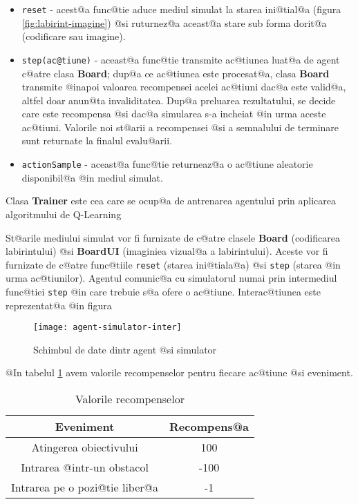 \begin{itemize}
	\item \texttt{reset} - acest@a func@tie aduce mediul simulat la starea ini@tial@a (figura \ref{fig:labirint-imagine}) @si ruturnez@a aceast@a stare sub forma dorit@a (codificare sau imagine).
	\item \texttt{step(ac@tiune)} - aceast@a func@tie transmite ac@tiunea luat@a de agent c@atre clasa \textbf{Board}; dup@a ce ac@tiunea este procesat@a, clasa \textbf{Board} transmite @inapoi valoarea recompensei acelei ac@tiuni dac@a este valid@a, altfel doar anun@ta invaliditatea. Dup@a preluarea rezultatului, se decide care este recompensa @si dac@a simularea s-a incheiat @in urma aceste ac@tiuni. Valorile noi st@arii a recompensei @si a semnalului de terminare sunt returnate la finalul evalu@arii.
	\item \texttt{actionSample} - aceast@a func@tie returneaz@a o ac@tiune aleatorie disponibil@a @in mediul simulat.
\end{itemize}

Clasa \textbf{Trainer} este cea care se ocup@a de antrenarea agentului prin aplicarea algoritmului de Q-Learning


St@arile mediului simulat vor fi furnizate de c@atre clasele \textbf{Board} (codificarea labirintului) @si \textbf{BoardUI} (imaginiea vizual@a a labirintului). Aceste vor fi furnizate de c@atre func@tiile \texttt{reset} (starea ini@tiala@a) @si \texttt{step} (starea @in urma ac@tiunilor). Agentul comunic@a cu simulatorul numai prin intermediul func@tiei \texttt{step} @in care trebuie s@a ofere o ac@tiune. Interac@tiunea este reprezentat@a @in figura 

\begin{figure}[h!]
	\centering
	\texttt{[image: agent-simulator-inter]}
	\caption{Schimbul de date dintr agent @si simulator}
	\label{fig:agent-simulator-inter}
\end{figure}

@In tabelul \ref{fig:tabel-recompense} avem valorile recompenselor pentru fiecare ac@tiune @si eveniment.

\begin{table}[H]
	\begin{center}
		\begin{tabular}{|c|c|} 
			\hline
			Eveniment & Recompens@a \\
			\hline
			Atingerea obiectivului & 100 \\
			\hline
			Intrarea @intr-un obstacol & -100 \\
			\hline
			Intrarea pe o pozi@tie liber@a & -1 \\
			\hline
		\end{tabular}
	\end{center}
	\caption{Valorile recompenselor}
	\label{fig:tabel-recompense}
\end{table}


